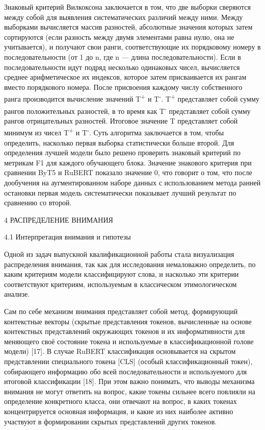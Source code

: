 \begin{itemize}
  Знаковый критерий Вилкоксона заключается в том, что две выборки сверяются между собой для выявления систематических различий между ними. Между выборками вычисляется массив разностей, абсолютные значения которых затем сортируются (если разность между двумя элементами равна нулю, она не учитывается), и получают свои ранги, соответствующие их порядковому номеру в последовательности (от 1 до n, где n --- длина последовательности). Если в последовательности идут подряд несколько одинаковых чисел, вычисляется среднее арифметическое их индексов, которое затем присваивается их рангам вместо порядкового номера. После присвоения каждому числу собственного ранга производится вычисление значений T\textsuperscript{+} и T\textsuperscript{-}. T\textsuperscript{+} представляет собой сумму рангов положительных разностей, в то время как T\textsuperscript{-} представляет собой сумму рангов отрицательных разностей. Итоговое значение T представляет собой минимум из чисел T\textsuperscript{+} и T\textsuperscript{-}. Суть алгоритма заключается в том, чтобы определить, насколько первая выборка статистически больше второй. Для определения лучшей модели было решено проверить знаковый критерий по метрикам F1 для каждого обучающего блока. Значение знакового критерия при сравнении ByT5 и RuBERT показало значение 0, что говорит о том, что после дообучения на аугментированном наборе данных с использованием метода ранней остановки первая модель систематически показывает лучший результат по сравнению со второй.

  4 РАСПРЕДЕЛЕНИЕ ВНИМАНИЯ

  4.1 Интерпретация внимания и гипотезы

  Одной из задач выпускной квалификационной работы стала визуализация распределения внимания, так как для исследования немаловажно определить, по каким критериям модели классифицируют слова, и насколько эти критерии соответствуют критериям, используемым в классическом этимологическом анализе.

  Сам по себе механизм внимания представляет собой метод, формирующий контекстные векторы (скрытые представления токенов, вычисленные на основе контекстных представлений окружающих токенов и их информативности для меняющего своё состояние токена и используемые в классификационной голове модели) {[}17{]}. В случае RuBERT классификация основывается на скрытом представлении специального токена {[}CLS{]} (особый классификационный токен), собирающего информацию обо всей последовательности и используемого для итоговой классификации {[}18{]}. При этом важно понимать, что выводы механизма внимания не могут ответить на вопрос, какие токены сильнее всего повлияли на определение конкретного класса, они отвечают на вопрос, в каких токенах концентрируется основная информация, и какие из них наиболее активно участвуют в формировании скрытых представлений других токенов.


\end{itemize}
